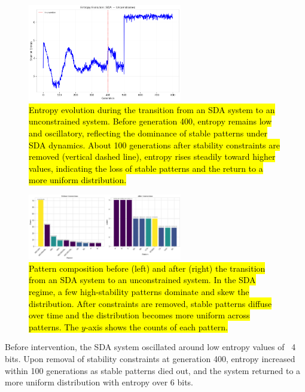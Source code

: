 \documentclass[preprint,12pt]{elsarticle}
\newcommand{\added}[1]{\hl{#1}}
\begin{document}
\begin{figure}[H]
    \centering
    \includegraphics[width=0.6\textwidth]{figure_8.png}
    \caption{\added{Entropy evolution during the transition from an SDA system to an unconstrained system. Before generation 400, entropy remains low and
    oscillatory, reflecting the dominance of stable patterns under SDA dynamics.
    About 100 generations after stability constraints are removed 
    (vertical dashed line), entropy rises
    steadily toward higher values, indicating the loss of stable patterns and the
    return to a more uniform distribution.}}

    \label{fig:s2u-entropy}
\end{figure}

\begin{figure}[H]
    \centering
    \includegraphics[width=0.6\textwidth]{figure_9.png}
    \caption{\added{Pattern composition before (left) and after (right) the 
    transition from an SDA system to an unconstrained system. 
    In the SDA regime, a few
    high-stability patterns dominate and skew the distribution. 
    After constraints are
    removed, stable patterns diffuse over time and the distribution becomes
    more uniform across patterns. The $y$-axis shows the counts of each pattern.}}
    \label{fig:s2u-patterns}
\end{figure}

Before intervention, the SDA system oscillated around low entropy values of ~4 bits. Upon removal of stability constraints at generation 400, entropy increased within 100 generations as stable patterns died out, and the system returned to a more uniform distribution with entropy over 6 bits.
\end{document}
